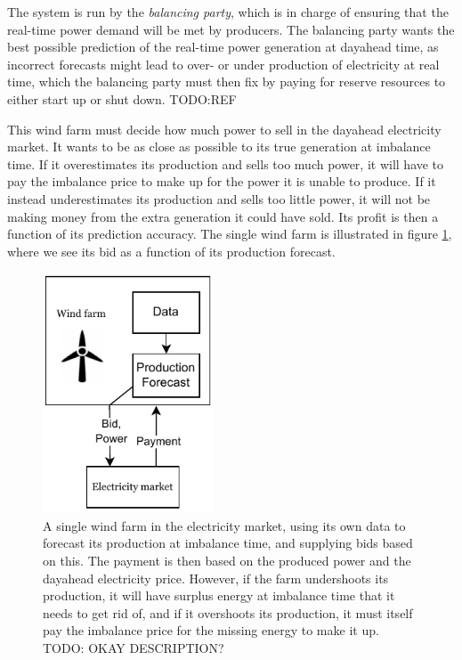 The system is run by the \emph{balancing party}, which is in charge of ensuring
that the real-time power demand will be met by producers. The balancing party
wants the best possible prediction of the real-time power generation at
dayahead time, as incorrect forecasts might lead to over- or under production
of electricity at real time, which the balancing party must then fix by paying
for reserve resources to either start up or shut down. TODO:REF

This wind farm must decide how much power to sell in the dayahead electricity
market. It wants to be as close as possible to its true generation at imbalance
time. If it overestimates its production and sells too much power, it will have
to pay the imbalance price to make up for the power it is unable to produce. If
it instead underestimates its production and sells too little power, it will
not be making money from the extra generation it could have sold. Its profit is
then a function of its prediction accuracy. The single wind farm is illustrated
in figure \ref{fig:single_wind_farm}, where we see its bid as a function of its
production forecast.

\begin{figure}
  \centering
  \includegraphics[width=2in]{Pictures/single_wind_farm.pdf}
  \caption{A single wind farm in the electricity market, using its own data to
  forecast its production at imbalance time, and supplying bids based on this.
  The payment is then based on the produced power and the dayahead electricity
  price. However, if the farm undershoots its production, it will have surplus
  energy at imbalance time that it needs to get rid of, and if it overshoots
  its production, it must itself pay the imbalance price for the missing energy
  to make it up. TODO: OKAY DESCRIPTION?}
  \label{fig:single_wind_farm}
\end{figure}

